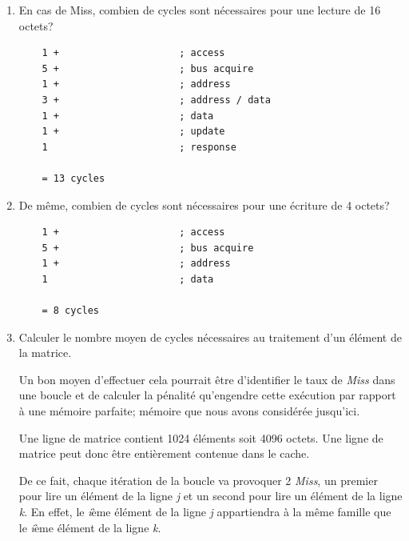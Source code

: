 \begin{enumerate}
  \item
    En cas de Miss, combien de cycles sont n\'ecessaires pour une lecture de
    16 octets?

    \begin{correction}

      \begin{verbatim}
	1 +                     ; access
	5 +                     ; bus acquire
	1 +                     ; address
	3 +                     ; address / data
	1 +                     ; data
	1 +                     ; update
	1                       ; response

	= 13 cycles
      \end{verbatim}

    \end{correction}
  \item
    De m\^eme, combien de cycles sont n\'ecessaires pour une \'ecriture de
    4 octets?

    \begin{correction}

      \begin{verbatim}
	1 +                     ; access
	5 +                     ; bus acquire
	1 +                     ; address
	1                       ; data

	= 8 cycles
      \end{verbatim}

    \end{correction}
  \item
    Calculer le nombre moyen de cycles n\'ecessaires au traitement d'un
    \'el\'ement de la matrice.

    Un bon moyen d'effectuer cela pourrait \^etre d'identifier le taux de
    \textit{Miss} dans une boucle et de calculer la p\'enalit\'e
    qu'engendre cette ex\'ecution par rapport \`a une m\'emoire parfaite;
    m\'emoire que nous avons consid\'er\'ee jusqu'ici.

    \begin{correction}

      Une ligne de matrice contient 1024 \'el\'ements soit 4096 octets.
      Une ligne de matrice peut donc \^etre enti\`erement contenue dans le
      cache.

      De ce fait, chaque it\'eration de la boucle va provoquer 2 \textit{Miss},
      un premier pour lire un \'el\'ement de la ligne \textit{j} et un second
      pour lire un \'el\'ement de la ligne \textit{k}. En effet, le
      \textit{i}\`eme \'el\'ement de la ligne \textit{j} appartiendra \`a la
      m\^eme famille que le \textit{i}\`eme \'el\'ement de la ligne \textit{k}.


\end{correction}
\end{enumerate}
